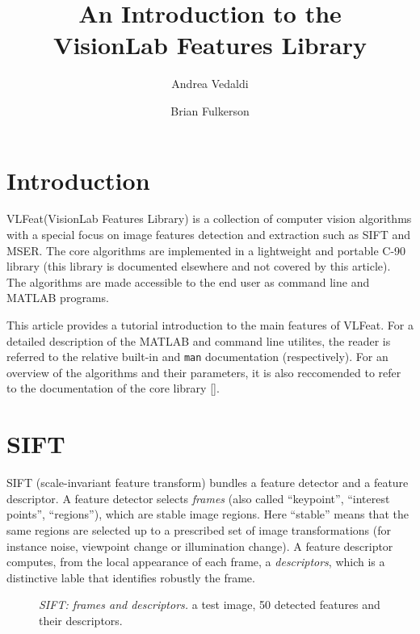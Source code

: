 \documentclass{article}
\title{An Introduction to the\\ VisionLab Features Library}
\author{Andrea Vedaldi \and Brian Fulkerson}
\newcommand{\VLFeat}{{\sc VLFeat}\xspace}
\begin{document}

\ifpdf\twocolumn\fi
\maketitle{}
\ifpdf\tableofcontents{}\fi

\section{Introduction}\label{intro}

\VLFeat (VisionLab Features Library) is a collection of computer
vision algorithms with a special focus on image features detection and
extraction such as SIFT and MSER. The core algorithms are implemented
in a lightweight and portable C-90 library (this library is documented
elsewhere and not covered by this article). The algorithms are made
accessible to the end user as command line and MATLAB programs.

This article provides a tutorial introduction to the main features of
\VLFeat. For a detailed description of the MATLAB and command line
utilites, the reader is referred to the relative built-in and
\verb$man$ documentation (respectively). For an overview of the
algorithms and their parameters, it is also reccomended to refer to
the documentation of the core library [].

\section{SIFT}\label{sift}

SIFT (scale-invariant feature transform) bundles a feature detector
and a feature descriptor. A feature detector selects {\em frames}
(also called ``keypoint'', ``interest points'', ``regions''), which
are stable image regions. Here ``stable'' means that the same regions
are selected up to a prescribed set of image transformations (for
instance noise, viewpoint change or illumination change). A feature
descriptor computes, from the local appearance of each frame, a {\em
  descriptors}, which is a distinctive lable that identifies robustly
the frame.

\begin{figure*}
\hfill
{}
\hfill
{}
\caption{{\em SIFT: frames and descriptors.} 
  a test image,  50 detected features
   and their
  descriptors.}\label{fig:sift-intro}
\end{figure*}
\end{document}
